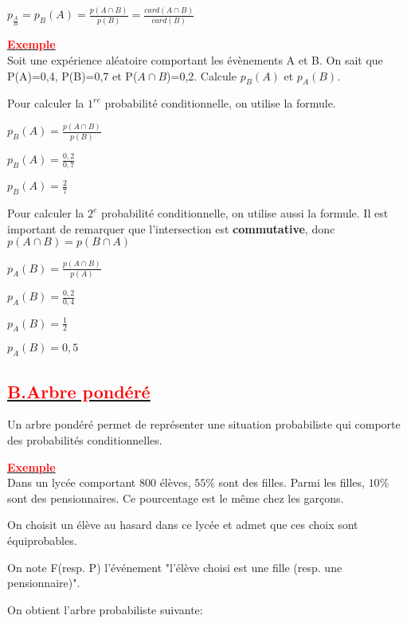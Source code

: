 \documentclass[12pt]{article}
\begin{document}
$p_{\frac{A}{B}}=p_{B}(A)=\frac{p(A\cap B)}{p(B)}=\frac{card(A\cap B)}{card(B)}$

\underline{\textbf{\textcolor{red}{Exemple}}}\\
Soit une expérience aléatoire comportant les évènements A et B. On sait que
P(A)=0,4,  P(B)=0,7 et P($A\cap B$)=0,2. Calcule $p_{B}(A)$ et $p_{A}(B)$.

Pour calculer la $1^{re}$ probabilité conditionnelle, on utilise la formule.

$p_{B}(A)=\frac{p(A\cap B)}{p(B)}$

$p_{B}(A)=\frac{0,2}{0,7}$

$p_{B}(A)=\frac{2}{7}$

Pour calculer la $2^{e}$ probabilité conditionnelle, on utilise aussi la formule. Il est important de remarquer que l’intersection est \textbf{commutative}, donc 
$p(A\cap B)=p(B\cap A)$

$p_{A}(B)=\frac{p(A\cap B)}{p(A)}$

$p_{A}(B)=\frac{0,2}{0,4}$

$p_{A}(B)=\frac{1}{2}$

$p_{A}(B)=0,5$
\subsection*{\underline{\textbf{\textcolor{red}{B.Arbre pondéré}}}}
Un arbre pondéré permet de représenter une situation probabiliste qui comporte des probabilités conditionnelles.

\underline{\textbf{\textcolor{red}{Exemple }}}\\
Dans un lycée comportant 800 élèves, $55\%$ sont des filles. Parmi les filles, $10\%$ sont des pensionnaires. Ce pourcentage est le même chez les garçons.

On choisit un élève au hasard dans ce lycée et admet que ces choix sont équiprobables.

On note F(resp. P) l'événement "l'élève choisi est une fille (resp. une pensionnaire)".

On obtient l'arbre probabiliste suivante:
\end{document}
